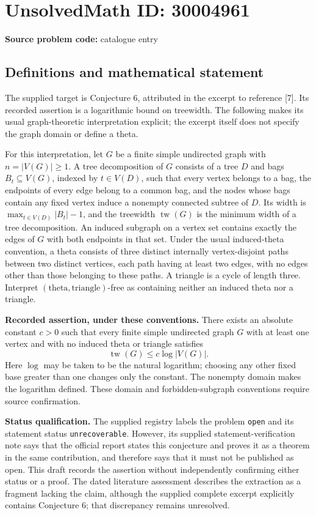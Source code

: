 \documentclass[11pt]{article}
\begin{document}
\section*{UnsolvedMath ID: 30004961}
\textbf{Source problem code:} catalogue entry
\subsection{Definitions and mathematical statement}
The supplied target is Conjecture 6, attributed in the excerpt to reference [7]. Its recorded assertion is a logarithmic bound on treewidth. The following makes its usual graph-theoretic interpretation explicit; the excerpt itself does not specify the graph domain or define a theta.

For this interpretation, let \(G\) be a finite simple undirected graph with \(n=|V(G)|\geq 1\). A tree decomposition of \(G\) consists of a tree \(D\) and bags \(B_t\subseteq V(G)\), indexed by \(t\in V(D)\), such that every vertex belongs to a bag, the endpoints of every edge belong to a common bag, and the nodes whose bags contain any fixed vertex induce a nonempty connected subtree of \(D\). Its width is \(\max_{t\in V(D)}|B_t|-1\), and the treewidth \(\operatorname{tw}(G)\) is the minimum width of a tree decomposition. An induced subgraph on a vertex set contains exactly the edges of \(G\) with both endpoints in that set. Under the usual induced-theta convention, a theta consists of three distinct internally vertex-disjoint paths between two distinct vertices, each path having at least two edges, with no edges other than those belonging to these paths. A triangle is a cycle of length three. Interpret \((\text{theta},\text{triangle})\)-free as containing neither an induced theta nor a triangle.

\textbf{Recorded assertion, under these conventions.} There exists an absolute constant \(c>0\) such that every finite simple undirected graph \(G\) with at least one vertex and with no induced theta or triangle satisfies
\[
\operatorname{tw}(G)\leq c\log |V(G)|.
\]
Here \(\log\) may be taken to be the natural logarithm; choosing any other fixed base greater than one changes only the constant. The nonempty domain makes the logarithm defined. These domain and forbidden-subgraph conventions require source confirmation.

\textbf{Status qualification.} The supplied registry labels the problem \texttt{open} and its statement status \texttt{unrecoverable}. However, its supplied statement-verification note says that the official report states this conjecture and proves it as a theorem in the same contribution, and therefore says that it must not be published as open. This draft records the assertion without independently confirming either status or a proof. The dated literature assessment describes the extraction as a fragment lacking the claim, although the supplied complete excerpt explicitly contains Conjecture 6; that discrepancy remains unresolved.
\end{document}
